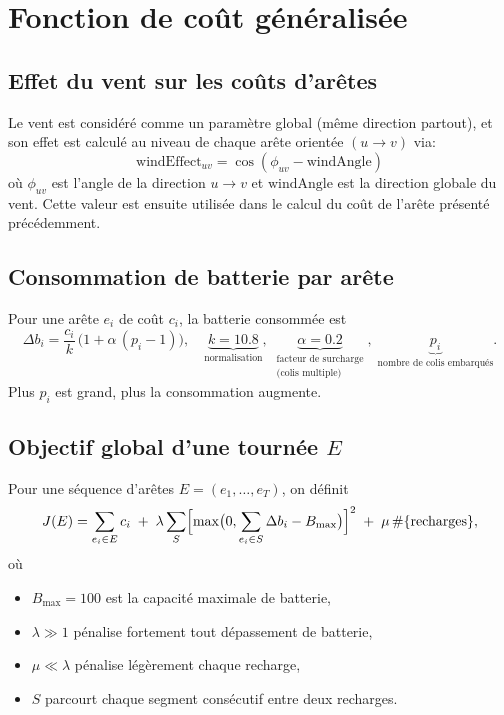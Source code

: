 \documentclass[11pt,a4paper]{article}
\begin{document}
\section{Fonction de coût généralisée}
\subsection{Effet du vent sur les coûts d'arêtes}
Le vent est considéré comme un paramètre global (même direction partout), et son effet est calculé au niveau de chaque arête orientée \((u\to v)\) via:
\[
  \text{windEffect}_{uv} = \cos(\phi_{uv} - \text{windAngle})
\]
où \(\phi_{uv}\) est l'angle de la direction \(u\to v\) et \(\text{windAngle}\) est la direction globale du vent. Cette valeur est ensuite utilisée dans le calcul du coût de l'arête présenté précédemment.

\subsection{Consommation de batterie par arête}
Pour une arête \(e_i\) de coût \(c_i\), la batterie consommée est
\[
  \Delta b_i
  = \frac{c_i}{k}\,\bigl(1 + \alpha\,(p_i - 1)\bigr),
  \quad
  \underbrace{k=10.8}_{\text{normalisation}},\;
  \underbrace{\alpha=0.2}_{\substack{\text{facteur de surcharge}\\\text{(colis multiple)}}},\;
  \underbrace{p_i}_{\text{nombre de colis embarqués}}.
\]
Plus \(p_i\) est grand, plus la consommation augmente.

\subsection{Objectif global d'une tournée \texorpdfstring{\(E\)}{E}}
Pour une séquence d'arêtes \(E=(e_1,\dots,e_T)\), on définit
\[
  J(E)
  =
  \sum_{e_i\in E} c_i
  \;+\;
  \lambda
  \sum_{S}
    \Bigl[\max\bigl(0,\sum_{e_i\in S}\Delta b_i - B_{\max}\bigr)\Bigr]^2
  \;+\;
  \mu\,\#\{\text{recharges}\},
\]
où
\begin{itemize}
  \item \(B_{\max}=100\) est la capacité maximale de batterie,
  \item \(\lambda\gg1\) pénalise fortement tout dépassement de batterie,
  \item \(\mu\ll\lambda\) pénalise légèrement chaque recharge,
  \item \(S\) parcourt chaque segment consécutif entre deux recharges.
\end{itemize}
\end{document}
